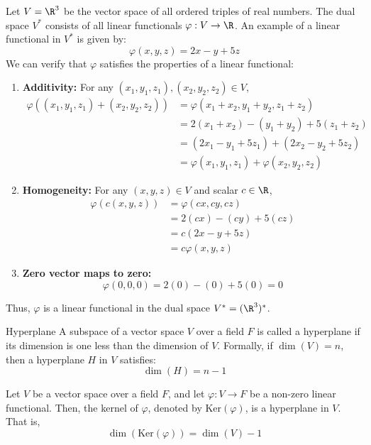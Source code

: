 \documentclass[openany]{book}
\begin{document}
\begin{example}
Let $V = \R^3$ be the vector space of all ordered triples of real numbers. The dual space $V^*$ consists of all linear functionals $\varphi: V \to \R$. An example of a linear functional in $V^*$ is given by:
$$\varphi(x, y, z) = 2x - y + 5z$$
We can verify that $\varphi$ satisfies the properties of a linear functional:
\begin{enumerate}
    \item \textbf{Additivity:} For any $(x_1, y_1, z_1), (x_2, y_2, z_2) \in V$,
    \[\begin{aligned}
    \varphi((x_1, y_1, z_1) + (x_2, y_2, z_2)) &= \varphi(x_1 + x_2, y_1 + y_2, z_1 + z_2) \\
    &= 2(x_1 + x_2) - (y_1 + y_2) + 5(z_1 + z_2) \\
    &= (2x_1 - y_1 + 5z_1) + (2x_2 - y_2 + 5z_2) \\
    &= \varphi(x_1, y_1, z_1) + \varphi(x_2, y_2, z_2)
    \end{aligned}\]
    \item \textbf{Homogeneity:} For any $(x, y, z) \in V$ and scalar $c \in \R$,
    \[\begin{aligned}
    \varphi(c(x, y, z)) &= \varphi(cx, cy, cz) \\
    &= 2(cx) - (cy) + 5(cz) \\
    &= c(2x - y + 5z) \\
    &= c\varphi(x, y, z)
    \end{aligned}\]
    \item \textbf{Zero vector maps to zero:} 
    $$\varphi(0, 0, 0) = 2(0) - (0) + 5(0) = 0$$
\end{enumerate}
Thus, $\varphi$ is a linear functional in the dual space $V^* = (\R^3)^*$.
\end{example}
\begin{mydefinition}{Hyperplane}
    A subspace of a vector space $V$ over a field $F$ is called a hyperplane if its dimension is one less than the dimension of $V$. Formally, if $\dim(V) = n$, then a hyperplane $H$ in $V$ satisfies:
    $$\dim(H) = n - 1$$
\end{mydefinition}
\begin{mytheorem}
Let $V$ be a vector space over a field $F$, and let $\varphi: V \to F$ be a non-zero linear functional. Then, the kernel of $\varphi$, denoted by $\text{Ker}(\varphi)$, is a hyperplane in $V$. That is,
$$\dim(\text{Ker}(\varphi)) = \dim(V) - 1$$
\end{mytheorem}
\end{document}
